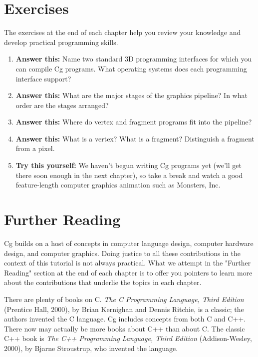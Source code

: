 \documentclass{book}
\begin{document}
\section{Exercises}

The exercises at the end of each chapter help you review your knowledge and develop practical programming skills.

\FloatBarrier
\begin{enumerate}
    \item \textbf{Answer this:} Name two standard 3D programming interfaces for which you can compile Cg programs. What operating systems does each programming interface support?
    \item \textbf{Answer this:} What are the major stages of the graphics pipeline? In what order are the stages arranged?
    \item \textbf{Answer this:} Where do vertex and fragment programs fit into the pipeline?
    \item \textbf{Answer this:} What is a vertex? What is a fragment? Distinguish a fragment from a pixel.
    \item \textbf{Try this yourself:} We haven't begun writing Cg programs yet (we'll get there soon enough in the next chapter), so take a break and watch a good feature-length computer graphics animation such as Monsters, Inc.
\end{enumerate}
\FloatBarrier

\section{Further Reading}

Cg builds on a host of concepts in computer language design, computer hardware design, and computer graphics. Doing justice to all these contributions in the context of this tutorial is not always practical. What we attempt in the "Further Reading" section at the end of each chapter is to offer you pointers to learn more about the contributions that underlie the topics in each chapter.
\par
There are plenty of books on C. \textit{The C Programming Language, Third Edition} (Prentice Hall, 2000), by Brian Kernighan and Dennis Ritchie, is a classic; the authors invented the C language. Cg includes concepts from both C and C++. There now may actually be more books about C++ than about C. The classic C++ book is \textit{The C++ Programming Language, Third Edition} (Addison-Wesley, 2000), by Bjarne Stroustrup, who invented the language.
\end{document}
